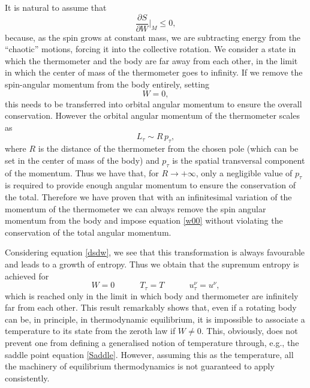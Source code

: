 \documentclass[twocolumn,usenatbib]{mnras2}
\newcommand{\spc}{\quad \quad \quad}
\begin{document}
It is natural to assume that
\begin{equation}\label{dsdw}
\dfrac{\partial S}{\partial W} \bigg|_M \leq 0,
\end{equation}
because, as the spin grows at constant mass, we are subtracting energy from the ``chaotic'' motions, forcing it into the collective rotation. We consider a state in which the thermometer and the body are far away from each other, in the limit in which the center of mass of the thermometer goes to infinity. If we remove the spin-angular momentum from the body entirely, setting
\begin{equation}\label{w00}
W=0,
\end{equation}
this needs to be transferred into orbital angular momentum to ensure the overall conservation. However the orbital angular momentum of the thermometer scales as
\begin{equation}
L_\tau \sim R \, p_\tau,
\end{equation}
where $R$ is the distance of the thermometer from the chosen pole (which can be set in the center of mass of the body) and $p_\tau$ is the spatial transversal component of the momentum. Thus we have that, for $R \longrightarrow +\infty$, only a negligible value of $p_\tau$ is required to provide enough angular momentum to ensure the conservation of the total. Therefore we have proven that with an infinitesimal variation of the momentum of the thermometer we can always remove the spin angular momentum from the body and impose equation \eqref{w00} without violating the conservation of the total angular momentum.  

Considering equation \eqref{dsdw}, we see that this transformation is always favourable and leads to a growth of entropy. Thus we obtain that the supremum entropy is achieved for
\begin{equation}
W=0  \spc T_\tau = T  \spc u_\tau^\nu = u^\nu,
\end{equation} 
which is reached only in the limit in which body and thermometer are infinitely far from each other. This result remarkably shows that, even if a rotating body can be, in principle, in thermodynamic equilibrium, it is impossible to associate a temperature to its state from the zeroth law if $W \neq 0$. This, obviously, does not prevent one from defining a generalised notion of temperature through, e.g., the saddle point equation \eqref{Saddle}. However, assuming this as the temperature, all the machinery of equilibrium thermodynamics is not guaranteed to apply consistently. 
\end{document}
